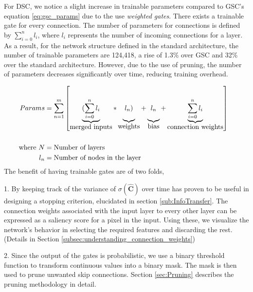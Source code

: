 \documentclass{article}
\let\oldhat\hat
\renewcommand{\hat}[1]{\oldhat{\mathbf{#1}}}
\begin{document}
For DSC, we notice a slight increase in trainable parameters compared to GSC's equation \ref{eq:gsc_params} due to the use \emph{weighted gates}. There exists a trainable gate for every connection. The number of parameters for connections is defined by $\sum_{i=0}^{n}l_{i}$, where $l_{i}$ represents the number of incoming connections for a layer. As a result, for the network structure defined in the standard architecture, the number of trainable parameters are 124,418, a rise of 1.3\% over GSC and 32\% over the standard architecture. However, due to the use of pruning, the number of parameters decreases significantly over time, reducing training overhead.

\begin{equation}
\label{eq:dsc_params}
\begin{aligned}
Params &= \sum_{n=1}^{m}\left[
\underbrace{(\sum_{i=0}^{n}l_{i}\rule[-12pt]{0pt}{5pt}}_{\mbox{merged inputs}}
*\underbrace{l_{n})\rule[-12pt]{0pt}{5pt}}_{\mbox{weights}}
+\underbrace{l_{n}\rule[-12pt]{0pt}{5pt}}_{\mbox{bias}}
+\underbrace{\sum_{i=0}^{n}l_{i}\rule[-12pt]{0pt}{5pt}}_{\mbox{connection weights}}\right] &\\
\\
\text{where}~N &= \text{Number of layers} \\
l_{n} &= \text{Number of nodes in the layer}\\
\end{aligned}
\end{equation}
The benefit of having trainable gates are of two folds,

1. By keeping track of the variance of $\sigma{(\hat{C})}$ over time has proven to be useful in designing a stopping criterion, elucidated in section \ref{sub:InfoTransfer}. The connection weights associated with the input layer to every other layer can be expressed as a saliency score for a pixel in the input. Using these, we visualize the network's behavior in selecting the required features and discarding the rest. (Details in Section \ref{subsec:understanding_connection_weights})

2. Since the output of the gates is probabilistic, we use a binary threshold function to transform continuous values into a binary mask. The mask is then used to prune unwanted skip connections. Section \ref{sec:Pruning} describes the pruning methodology in detail.

\par
\bigskip

\par
\bigskip
\end{document}
